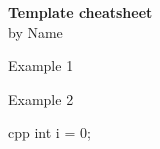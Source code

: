 \documentclass[10pt, a4paper, landscape]{article}
\begin{document}
	
\begin{onehalfspace}
	
	\begin{multicols}{4}
	
		\begin{flushleft}
			\LARGE{\bf{\textcolor{\mainColor}{\textbf{Template cheatsheet}}}} \\
			\large{by \textcolor{\mainColor}{Name}}
		\end{flushleft}
		
		\begin{Text}{Example 1}
			 \lipsum[1]
			
			\begin{Note}
				\lipsum[2]	
			\end{Note}
		
			\lipsum[3-4]
		\end{Text}
	
		\begin{Text}{Example 2}		
			\lipsum[2]
\begin{Code}{cpp}
int i = 0;
\end{Code}
			
			\begin{Important}
				\lipsum[2]	
			\end{Important}
			
			\lipsum[3-6]
		\end{Text}
		
	\end{multicols}

\end{onehalfspace}
	
\end{document}
